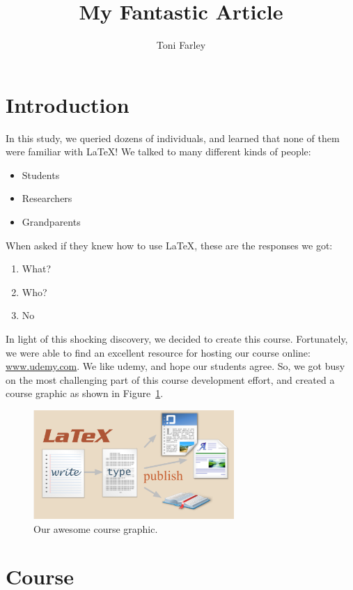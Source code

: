 \documentclass{proc}
\title{My Fantastic Article}
\author{Toni Farley}
\date{}
\begin{document}
\maketitle

\section{Introduction}

In this study, we queried dozens of individuals, and learned that none of them were familiar with \LaTeX!  We talked to many different kinds of people:

\begin{itemize}
\item Students
\item Researchers
\item Grandparents
\end{itemize}

\noindent When asked if they knew how to use \LaTeX, these are the responses we got:

\begin{enumerate}
\item What?
\item Who?
\item No
\end{enumerate}

In light of this shocking discovery, we decided to create this course. Fortunately, we were able to find an excellent resource for hosting our course online: \url{www.udemy.com}. We like udemy, and hope our students agree. So, we got busy on the most challenging part of this course development effort, and created a course graphic as shown in Figure~\ref{fig:course}.

\begin{figure}[htbp]
\begin{center}
\includegraphics[width=3in]{Course-Graphic}
\caption{Our awesome course graphic.}
\label{fig:course}
\end{center}
\end{figure}

\section{Course}
\end{document}
